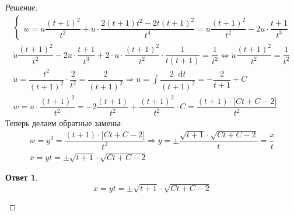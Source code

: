 \documentclass[a4paper,12pt]{article}
\newtheorem*{ans}{Ответ}
\renewcommand*\d{\mathop{}\!\mathrm{d}}
\newcommand{\dw}{\dot{w}}
\newcommand{\du}{\dot{u}}
\newcommand{\bto}{\Longrightarrow}
\newcommand{\ds}{\displaystyle}
\begin{document}
\begin{proof}[Решение]
\begin{gather*}
\begin{cases}
	\dw = \du \dfrac{(t + 1)^2}{t^2} + u \cdot \dfrac{2(t + 1)t^2 - 2t(t + 1)^2}{t^4} = \du \dfrac{(t + 1)^2}{t^2} - 2u \cdot \dfrac{t + 1}{t^3}
	\end{cases}\\
	\du \dfrac{(t + 1)^2}{t^2} - 2u \cdot \dfrac{t + 1}{t^3} + 2 \cdot u \cdot \dfrac{(t + 1)^2}{t^2} \cdot \dfrac{1}{t(t + 1)} = \dfrac{1}{t^2} \iff \du \dfrac{(t + 1)^2}{t^2} = \dfrac{1}{t^2}\\
	\du = \dfrac{t^2}{(t + 1)^2} \cdot \dfrac{2}{t^2} = \dfrac{2}{(t + 1)^2} \bto u = \ds\int \dfrac{2\d t}{(t + 1)^2} = -\dfrac{2}{t + 1} + C\\
	w = u \cdot \dfrac{(t + 1)^2}{t^2} = -2\dfrac{(t + 1)}{t^2} + \dfrac{(t + 1)^2}{t^2} \cdot C = \dfrac{(t + 1) \cdot \big[Ct + C - 2\big]}{t^2}
	\end{gather*}
	Теперь делаем обратные замены:
	\begin{gather*}
	w = y^2 = \dfrac{(t + 1) \cdot \big[Ct + C - 2\big]}{t^2} \bto y = \ds\pm \dfrac{\sqrt{t + 1} \cdot \sqrt{Ct + C - 2}}{t} = \dfrac{x}{t}\\
	x = yt = \pm \sqrt{t + 1} \cdot \sqrt{Ct + C - 2}
	\end{gather*}
	\begin{ans}
		\[x = yt = \pm \sqrt{t + 1} \cdot \sqrt{Ct + C - 2}\]
	\end{ans}
\end{proof}
\end{document}
